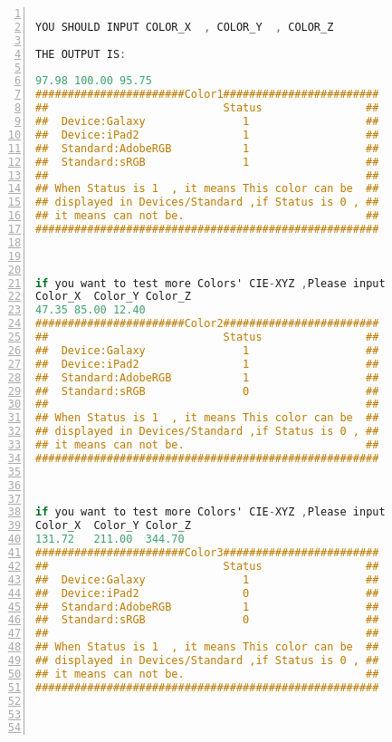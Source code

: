 \documentclass[UTF8]{article}
\begin{document}
\begin{lstlisting}[language=C, label=lst:4coloroutput, caption=Answers, numbers=left, stepnumber=1, frame=leftline , texcl=true, basicstyle=\ttfamily]

YOU SHOULD INPUT COLOR_X  , COLOR_Y  , COLOR_Z

THE OUTPUT IS:

97.98 100.00 95.75
#######################Color1########################
##                           Status                ##
##  Device:Galaxy               1                  ##
##  Device:iPad2                1                  ##
##  Standard:AdobeRGB           1                  ##
##  Standard:sRGB               1                  ##
##                                                 ##
## When Status is 1  , it means This color can be  ##
## displayed in Devices/Standard ,if Status is 0 , ##
## it means can not be.                            ##
#####################################################



if you want to test more Colors' CIE-XYZ ,Please input
Color_X  Color_Y Color_Z
47.35 85.00 12.40
#######################Color2########################
##                           Status                ##
##  Device:Galaxy               1                  ##
##  Device:iPad2                1                  ##
##  Standard:AdobeRGB           1                  ##
##  Standard:sRGB               0                  ##
##                                                 ##
## When Status is 1  , it means This color can be  ##
## displayed in Devices/Standard ,if Status is 0 , ##
## it means can not be.                            ##
#####################################################



if you want to test more Colors' CIE-XYZ ,Please input
Color_X  Color_Y Color_Z
131.72   211.00  344.70
#######################Color3########################
##                           Status                ##
##  Device:Galaxy               1                  ##
##  Device:iPad2                0                  ##
##  Standard:AdobeRGB           1                  ##
##  Standard:sRGB               0                  ##
##                                                 ##
## When Status is 1  , it means This color can be  ##
## displayed in Devices/Standard ,if Status is 0 , ##
## it means can not be.                            ##
#####################################################




\end{lstlisting}
\end{document}
